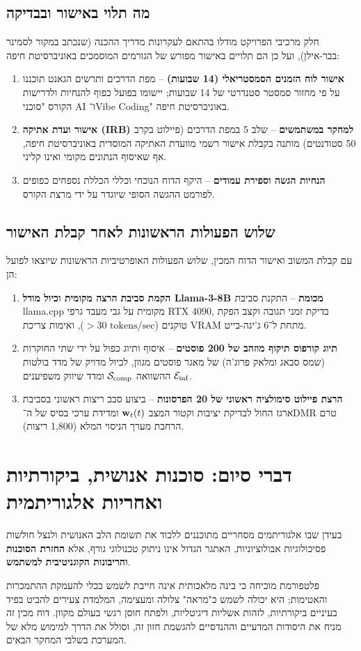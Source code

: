 \subsection{מה תלוי באישור ובבדיקה}
חלק מרכיבי הפרויקט מודלו בהתאם לעקרונות מדריך ההכנה (שנכתב במקור לסמינר בבר-אילן), ועל כן הם תלויים באישור מפורש של הגורמים המוסמכים באוניברסיטת חיפה:
\begin{enumerate}
    \item \textbf{אישור לוח הזמנים הסמסטריאלי (14 שבועות)} -- מפת הדרכים ותרשים הגאנט תוכננו על פי מחזור סמסטר סטנדרטי של 14 שבועות; יישומו בפועל כפוף להנחיות ולדרישות הקורס "סוכני AI ו־Vibe Coding" באוניברסיטת חיפה.
    \item \textbf{אישור ועדת אתיקה (\textenglish{IRB}) למחקר במשתמשים} -- שלב 5 במפת הדרכים (פיילוט בקרב 50 סטודנטים) מותנה בקבלת אישור רשמי מוועדת האתיקה המוסדית באוניברסיטת חיפה, אף שאיסוף הנתונים מקומי ואינו קליני.
    \item \textbf{הנחיות הגשה וספירת עמודים} -- היקף הדוח הנוכחי וכללי הכללת נספחים כפופים לפורמט ההגשה הסופי שיוגדר על ידי מרצת הקורס.
\end{enumerate}

\subsection{שלוש הפעולות הראשונות לאחר קבלת האישור}
עם קבלת המשוב ואישור הדוח המכין, שלוש הפעולות האופרטיביות הראשונות שיוצאו לפועל הן:
\begin{enumerate}
    \item \textbf{הקמת סביבת הרצה מקומית וכיול מודל \textenglish{Llama-3-8B} מכומת} -- התקנת סביבת \textenglish{llama.cpp} מקומית על גבי מעבד גרפי \textenglish{RTX 4090}, בדיקת זמני תגובה וקצב הפקת טוקנים ($>30\text{ tokens/sec}$), ואימות צריכת \textenglish{VRAM} מתחת ל־6 ג'יגה-בייט.
    \item \textbf{תיוג קורפוס תיקוף מוזהב של 200 פוסטים} -- איסוף ותיוג כפול על ידי שתי החוקרות (שמס סבאג ומלאק פרוג'ה) של מאגר פוסטים מגוון, לכיול מדויק של מדד בולטות ההשוואה $\mathcal{S}_{\text{comp}}$ ומדד שיווק משפיענים $\mathcal{E}_{\text{inf}}$.
    \item \textbf{הרצת פיילוט סימולציה ראשוני של 20 הפרסונות} -- ביצוע סבב ריצות ראשוני בסביבת ארגז החול לבדיקת יציבות וקטור המצב $\mathbf{w}_t(t)$ ומדידת ערכי בסיס של ה־\textenglish{DMR} טרם הרחבת מערך הניסוי המלא (1,800 ריצות).
\end{enumerate}

\section{דברי סיום: סוכנות אנושית, ביקורתיות ואחריות אלגוריתמית}
\label{sec:conclusion_remarks}
בעידן שבו אלגוריתמים מסחריים מתוכננים ללכוד את תשומת הלב האנושית ולנצל חולשות פסיכולוגיות אבולוציוניות, האתגר הגדול אינו ניתוק טכנולוגי גורף, אלא \textbf{החזרת הסוכנות והריבונות הקוגניטיבית למשתמש}.

פלטפורמת \projectname{} מוכיחה כי בינה מלאכותית אינה חייבת לשמש ככלי להעמקת ההתמכרות והאטימות; היא יכולה לשמש כ"מראה" צלולה ומעצימה, המלמדת צעירים להביט בפיד בעיניים ביקורתיות, לזהות אשליות דיגיטליות, ולפתח חוסן רגשי בעולם מקוון. דוח מכין זה מניח את היסודות המדעיים וההנדסיים להגשמת חזון זה, וסולל את הדרך למימוש מלא של המערכת בשלבי המחקר הבאים.

